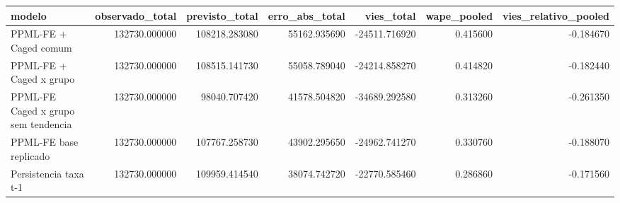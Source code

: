 \begin{tabular}{lrrrrrr}
\toprule
modelo & observado_total & previsto_total & erro_abs_total & vies_total & wape_pooled & vies_relativo_pooled \\
\midrule
PPML-FE + Caged comum & 132730.000000 & 108218.283080 & 55162.935690 & -24511.716920 & 0.415600 & -0.184670 \\
PPML-FE + Caged x grupo & 132730.000000 & 108515.141730 & 55058.789040 & -24214.858270 & 0.414820 & -0.182440 \\
PPML-FE Caged x grupo sem tendencia & 132730.000000 & 98040.707420 & 41578.504820 & -34689.292580 & 0.313260 & -0.261350 \\
PPML-FE base replicado & 132730.000000 & 107767.258730 & 43902.295650 & -24962.741270 & 0.330760 & -0.188070 \\
Persistencia taxa t-1 & 132730.000000 & 109959.414540 & 38074.742720 & -22770.585460 & 0.286860 & -0.171560 \\
\bottomrule
\end{tabular}
